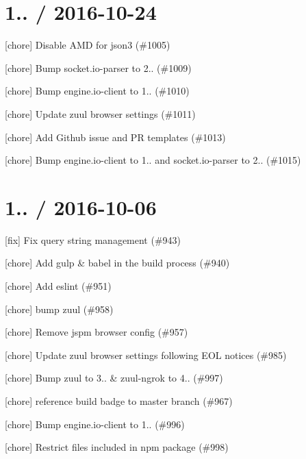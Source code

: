 \section*{1.. / 2016-\/10-\/24 }


\begin{DoxyItemize}
\item \mbox{[}chore\mbox{]} Disable A\+MD for json3 (\#1005)
\item \mbox{[}chore\mbox{]} Bump socket.\+io-\/parser to 2.. (\#1009)
\item \mbox{[}chore\mbox{]} Bump engine.\+io-\/client to 1.. (\#1010)
\item \mbox{[}chore\mbox{]} Update zuul browser settings (\#1011)
\item \mbox{[}chore\mbox{]} Add Github issue and PR templates (\#1013)
\item \mbox{[}chore\mbox{]} Bump engine.\+io-\/client to 1.. and socket.\+io-\/parser to 2.. (\#1015)
\end{DoxyItemize}

\section*{1.. / 2016-\/10-\/06 }


\begin{DoxyItemize}
\item \mbox{[}fix\mbox{]} Fix query string management (\#943)
\item \mbox{[}chore\mbox{]} Add gulp \& babel in the build process (\#940)
\item \mbox{[}chore\mbox{]} Add eslint (\#951)
\item \mbox{[}chore\mbox{]} bump zuul (\#958)
\item \mbox{[}chore\mbox{]} Remove jspm browser config (\#957)
\item \mbox{[}chore\mbox{]} Update zuul browser settings following E\+OL notices (\#985)
\item \mbox{[}chore\mbox{]} Bump zuul to 3.. \& zuul-\/ngrok to 4.. (\#997)
\item \mbox{[}chore\mbox{]} reference build badge to master branch (\#967)
\item \mbox{[}chore\mbox{]} Bump engine.\+io-\/client to 1.. (\#996)
\item \mbox{[}chore\mbox{]} Restrict files included in npm package (\#998)
\end{DoxyItemize}

